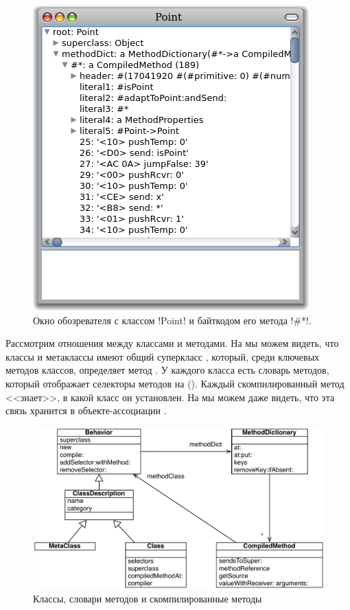 \documentclass[a4paper,10pt,twoside]{book}
\begin{document}
\begin{figure}[ht]\centering
	\includegraphics[width=.5\linewidth]{CompiledMethod}
	\caption{Окно обозревателя с классом \ct!Point! и байткодом его метода \ct!\#*!.}
\end{figure}

Рассмотрим отношения между классами и методами.
На  мы можем видеть, что классы и метаклассы имеют общий суперкласс , который, среди ключевых методов классов, определяет метод .
У каждого класса есть словарь методов, который отображает селекторы методов на  ().
Каждый скомпилированный метод <<знает>>, в какой класс он установлен.
На  мы можем даже видеть, что эта связь хранится в объекте-ассоциации .

\begin{figure}[ht]\centering
	\includegraphics[width=\linewidth]{MethodsAsObjects}
	\caption{Классы, словари методов и скомпилированные методы\figlabel{MethodsAsObjects}}
\end{figure}
\end{document}
